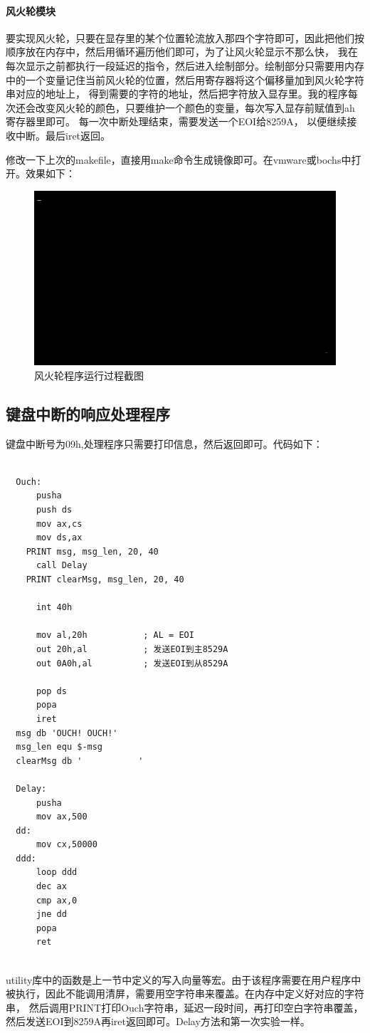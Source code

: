 \documentclass[a4paper, 11pt]{article} %
\begin{document}
\paragraph{风火轮模块}
要实现风火轮，只要在显存里的某个位置轮流放入那四个字符即可，因此把他们按顺序放在内存中，然后用循环遍历他们即可，为了让风火轮显示不那么快，
我在每次显示之前都执行一段延迟的指令，然后进入绘制部分。绘制部分只需要用内存中的一个变量记住当前风火轮的位置，然后用寄存器将这个偏移量加到风火轮字符串对应的地址上，
得到需要的字符的地址，然后把字符放入显存里。我的程序每次还会改变风火轮的颜色，只要维护一个颜色的变量，每次写入显存前赋值到ah寄存器里即可。
每一次中断处理结束，需要发送一个EOI给8259A， 以便继续接收中断。最后iret返回。

修改一下上次的makefile，直接用make命令生成镜像即可。在vmware或bochs中打开。效果如下：

\begin{figure}[H]
  \centering
  \includegraphics[width=0.8\linewidth]{mixtest.png}
  \caption{风火轮程序运行过程截图}
  \label{fig:mixtest}
\end{figure}

\subsection{键盘中断的响应处理程序}
键盘中断号为09h,处理程序只需要打印信息，然后返回即可。代码如下：

\begin{lstlisting}[language={[x86masm]Assembler},label=ouch.asm,caption=ouch.asm]
  %include "utility.inc"

  Ouch:
      pusha
      push ds
      mov ax,cs
      mov ds,ax
    PRINT msg, msg_len, 20, 40
      call Delay
    PRINT clearMsg, msg_len, 20, 40
      
      int 40h
  
      mov al,20h           ; AL = EOI
      out 20h,al           ; 发送EOI到主8529A
      out 0A0h,al          ; 发送EOI到从8529A
  
      pop ds
      popa
      iret
  msg db 'OUCH! OUCH!'
  msg_len equ $-msg
  clearMsg db '           '
  
  Delay:
      pusha
      mov ax,500
  dd:
      mov cx,50000
  ddd:
      loop ddd
      dec ax
      cmp ax,0
      jne dd
      popa
      ret
  
\end{lstlisting}
utility库中的函数是上一节中定义的写入向量等宏。由于该程序需要在用户程序中被执行，因此不能调用清屏，需要用空字符串来覆盖。在内存中定义好对应的字符串，
然后调用PRINT打印Ouch字符串，延迟一段时间，再打印空白字符串覆盖，然后发送EOI到8259A再iret返回即可。Delay方法和第一次实验一样。
\end{document}
